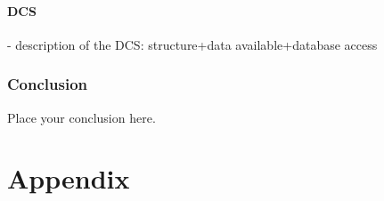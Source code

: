 \documentclass[UKenglish,texlive=2013]{\ATLASLATEXPATH atlasdoc}
\begin{document}


\subsection{DCS}

- description of the DCS: structure+data available+database access




\section{Conclusion}
\label{sec:conclusion}

Place your conclusion here.

\clearpage
\appendix
\part*{Appendix}

\end{document}
